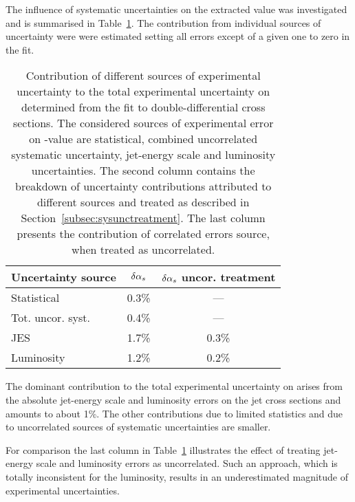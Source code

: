 The influence of systematic uncertainties on the extracted \asz value was investigated and is summarised in Table~\ref{tab:asuncbreakdown}. The contribution from individual sources of uncertainty were were estimated setting all errors except of a given one to zero in the \as fit.
\begin{table}
\centering
\begin{tabular}{|l|c|c|}
 \hline
 Uncertainty source & $\delta\mbox{$\alpha_{s}$}$ & $\delta\mbox{$\alpha_{s}$}$ uncor. treatment\\
 \hline\hline
 Statistical       & 0.3\% & ---     \\
 Tot. uncor. syst. & 0.4\% & ---     \\
 JES               & 1.7\% & 0.3\%   \\
 Luminosity        & 1.2\% & 0.2\%   \\
 \hline
\end{tabular}
\caption{Contribution of different sources of experimental uncertainty to the total experimental uncertainty on \asz determined from the fit to double-differential cross sections. The considered sources of experimental error on \asz-value are statistical, combined uncorrelated systematic uncertainty, jet-energy scale and luminosity uncertainties. The second column contains the breakdown of uncertainty contributions attributed to different sources and treated as described in Section~\ref{subsec:sysunctreatment}. The last column presents the contribution of correlated errors source, when treated as uncorrelated.}
\label{tab:asuncbreakdown}
\end{table}

The dominant contribution to the total experimental uncertainty on \as arises from the absolute jet-energy scale and luminosity errors on the jet cross sections and amounts to about 1\%. The other contributions due to limited statistics and due to uncorrelated sources of systematic uncertainties are smaller. 

For comparison the last column in Table~\ref{tab:asuncbreakdown} illustrates the effect of treating jet-energy scale and luminosity errors as uncorrelated. Such an approach, which is totally inconsistent for the luminosity, results in an underestimated magnitude of experimental uncertainties.